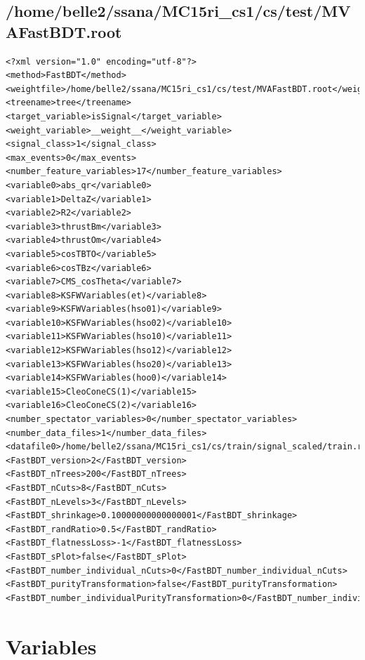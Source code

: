 \documentclass[10pt,a4paper]{article}
\begin{document}
\subsection{/home/belle2/ssana/MC15ri\_cs1/cs/test/MVAFastBDT.root}
\lstset{language=XML}
\begin{lstlisting}[breaklines=true]
<?xml version="1.0" encoding="utf-8"?>
<method>FastBDT</method>
<weightfile>/home/belle2/ssana/MC15ri_cs1/cs/test/MVAFastBDT.root</weightfile>
<treename>tree</treename>
<target_variable>isSignal</target_variable>
<weight_variable>__weight__</weight_variable>
<signal_class>1</signal_class>
<max_events>0</max_events>
<number_feature_variables>17</number_feature_variables>
<variable0>abs_qr</variable0>
<variable1>DeltaZ</variable1>
<variable2>R2</variable2>
<variable3>thrustBm</variable3>
<variable4>thrustOm</variable4>
<variable5>cosTBTO</variable5>
<variable6>cosTBz</variable6>
<variable7>CMS_cosTheta</variable7>
<variable8>KSFWVariables(et)</variable8>
<variable9>KSFWVariables(hso01)</variable9>
<variable10>KSFWVariables(hso02)</variable10>
<variable11>KSFWVariables(hso10)</variable11>
<variable12>KSFWVariables(hso12)</variable12>
<variable13>KSFWVariables(hso20)</variable13>
<variable14>KSFWVariables(hoo0)</variable14>
<variable15>CleoConeCS(1)</variable15>
<variable16>CleoConeCS(2)</variable16>
<number_spectator_variables>0</number_spectator_variables>
<number_data_files>1</number_data_files>
<datafile0>/home/belle2/ssana/MC15ri_cs1/cs/train/signal_scaled/train.root</datafile0>
<FastBDT_version>2</FastBDT_version>
<FastBDT_nTrees>200</FastBDT_nTrees>
<FastBDT_nCuts>8</FastBDT_nCuts>
<FastBDT_nLevels>3</FastBDT_nLevels>
<FastBDT_shrinkage>0.10000000000000001</FastBDT_shrinkage>
<FastBDT_randRatio>0.5</FastBDT_randRatio>
<FastBDT_flatnessLoss>-1</FastBDT_flatnessLoss>
<FastBDT_sPlot>false</FastBDT_sPlot>
<FastBDT_number_individual_nCuts>0</FastBDT_number_individual_nCuts>
<FastBDT_purityTransformation>false</FastBDT_purityTransformation>
<FastBDT_number_individualPurityTransformation>0</FastBDT_number_individualPurityTransformation>
\end{lstlisting}\raggedbottom
\pagebreak[0]
\FloatBarrier
\section{Variables}
\end{document}
